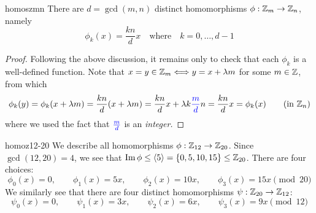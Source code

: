 \begin{cor}{}{homoszmn}
	There are $d=\gcd(m,n)$ distinct homomorphisms $\phi:\mathbb{Z}_m\to\mathbb{Z}_n$, namely
	\[
		\phi_k(x)=\frac{kn}{d}x
		\quad\text{where}\quad 
		k=0,\ldots,d-1
	\]
\end{cor}

\begin{proof}
	Following the above discussion, it remains only to check that each $\phi_k$ is a well-defined function. Note that $x=y\in\mathbb{Z}_m\Longleftrightarrow y=x+\lambda m$ for some $m\in\mathbb{Z}$, from which
	\[
	\phi_k(y)=\phi_k(x+\lambda m)
	=\frac{kn}d(x+\lambda m) 
	=\frac{kn}dx+\lambda k\textcolor{blue}{\frac md} n
	=\frac{kn}dx =\phi_k(x)
	\tag{in $\Z_n$}
	\]
	where we used the fact that $\textcolor{blue}{\frac md}$ is an \emph{integer.}
\end{proof}


\goodbreak


\begin{example}{}{homoz12-20}
	We describe all homomorphisms $\phi:\mathbb{Z}_{12}\to\mathbb{Z}_{20}$.\smallbreak
	Since $\gcd(12,20)=4$, we see that $\operatorname{Im}\phi\le\left\langle 5\right\rangle=\{0,5,10,15\}\le\mathbb{Z}_{20}$. There are four choices:
	\[
		\phi_0(x)=0,\qquad 
		\phi_1(x)=5x,\qquad 
		\phi_2(x)=10x,\qquad 
		\phi_3(x)=15x\pmod{20}
	\]
	We similarly see that there are four distinct homomorphisms $\psi:\mathbb{Z}_{20}\to\mathbb{Z}_{12}$:
	\[
		\psi_0(x)=0,\qquad 
		\psi_1(x)=3x,\qquad 
		\psi_2(x)=6x,\qquad 
		\psi_3(x)=9x\pmod{12}
	\]
\end{example} 


